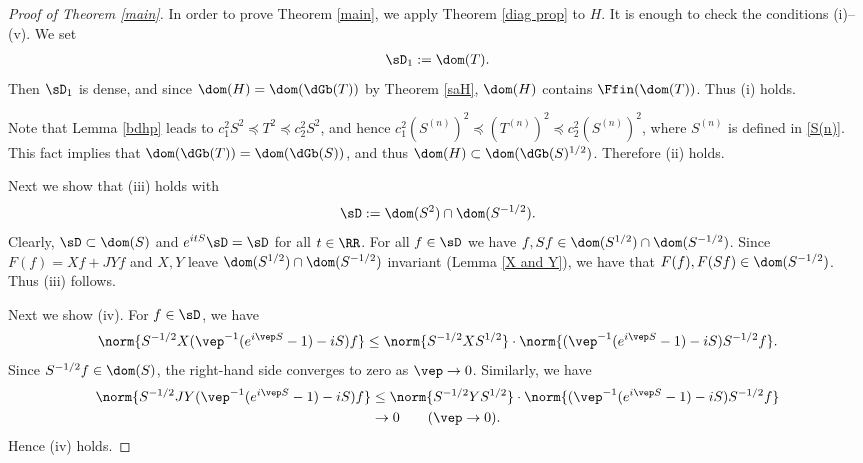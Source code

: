 \documentclass[12pt,draft]{article}
\theoremstyle{plain}
\numberwithin{equation}{section}
\theoremstyle{remark}
\begin{document}
\begin{proof}[Proof of Theorem \ref{main}]
In order to prove Theorem \ref{main}, we apply Theorem \ref{diag prop} to $H$.
It is enough to check the conditions (i)--(v).
We set 
\begin{align*}
 \sD_1 := \dom(T).  
\end{align*}
Then $\sD_1$ is dense, and since $\dom(H)=\dom(\dGb(T))$ by Theorem \ref{saH}, $\dom(H)$ contains $\Ffin(\dom(T))$.
Thus (i) holds.

Note that Lemma \ref{bdhp} leads to $c_1^2 S^2 \preceq T^2 \preceq c_2^2S^2$, 
and hence $c_1^2 \left(S^{(n)}\right)^2 \preceq \left(T^{(n)}\right)^2 \preceq c_2^2\left(S^{(n)}\right)^2$, where $S^{(n)}$ is defined in \eqref{S(n)}.
This fact implies that $\dom(\dGb(T))=\dom(\dGb(S))$, and thus $\dom(H)\subset\dom(\dGb(S)^{1/2})$.
Therefore (ii) holds.

Next we show that (iii) holds with
\begin{align*}
 \sD:=\dom(S^2)\cap\dom(S^{-1/2}).  
\end{align*}
Clearly, $\sD\subset \dom(S)$ and $e^{itS}\sD = \sD$ for all $t\in\RR$.
For all $f\in\sD$ we have $f,Sf \in \dom(S^{1/2})\cap\dom(S^{-1/2})$.
Since $F(f)=Xf+JYf$ and $X,Y$ leave $\dom(S^{1/2})\cap\dom(S^{-1/2})$ invariant (Lemma \ref{X and Y}),
we have that $F(f),F(Sf)\in\dom(S^{-1/2})$. Thus (iii) follows.

Next we show (iv). For $f\in\sD$, we have
\begin{align*}
  \norm{S^{-1/2}X(\vep^{-1}(e^{i\vep S}-1)-iS)f} 
\leq \norm{S^{-1/2}XS^{1/2}}\cdot \norm{(\vep^{-1}(e^{i\vep S}-1)-iS)S^{-1/2}f}.
\end{align*}
Since $S^{-1/2}f\in\dom(S)$, the right-hand side converges to zero as $\vep\to 0$. 
Similarly, we have
\begin{align*}
  \norm{S^{-1/2} JY(\vep^{-1}(e^{i\vep S}-1)-iS)f} 
&\leq \norm{S^{-1/2}YS^{1/2}}\cdot \norm{(\vep^{-1}(e^{i\vep S}-1)-iS)S^{-1/2}f} \\
& \to 0 \qquad (\vep\to 0).
\end{align*}
 Hence (iv) holds.


\end{proof}
\end{document}

